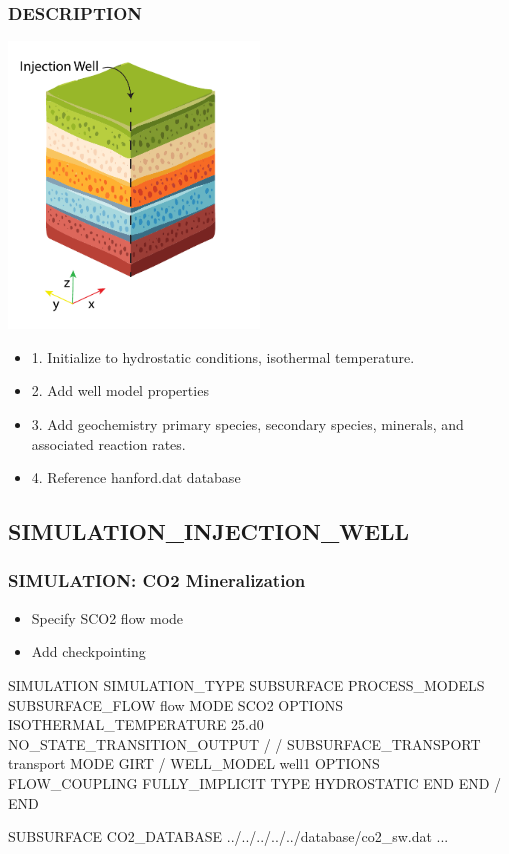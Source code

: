 \documentclass{beamer}
\begin{document}
\begin{frame}\frametitle{DESCRIPTION}

\includegraphics[height=3in]{injection-well-fig.pdf}

\newpage
\begin{itemize}
  \item 1. Initialize to hydrostatic conditions, isothermal temperature.
  \item 2. Add well model properties
  \item 3. Add geochemistry primary species, secondary species, minerals, and associated reaction rates.
  \item 4. Reference hanford.dat database
\end{itemize}

\end{frame}

\subsection{SIMULATION\_INJECTION\_WELL}

\begin{frame}\frametitle{SIMULATION: CO2 Mineralization}

\begin{itemize}
\item Specify SCO2 flow mode
\item Add checkpointing
\end{itemize}


\begin{semiverbatim}
SIMULATION
  SIMULATION_TYPE SUBSURFACE
  PROCESS_MODELS
    SUBSURFACE_FLOW flow
      MODE SCO2
      OPTIONS
        ISOTHERMAL_TEMPERATURE 25.d0
        NO_STATE_TRANSITION_OUTPUT
      /
    /
    SUBSURFACE_TRANSPORT transport
      MODE GIRT
    /
\newpage
    WELL_MODEL well1
      OPTIONS
        FLOW_COUPLING FULLY_IMPLICIT
        TYPE HYDROSTATIC
      END
    END
  /
END

SUBSURFACE
CO2_DATABASE ../../../../../database/co2_sw.dat
...

\end{semiverbatim}

\end{frame}
\end{document}
